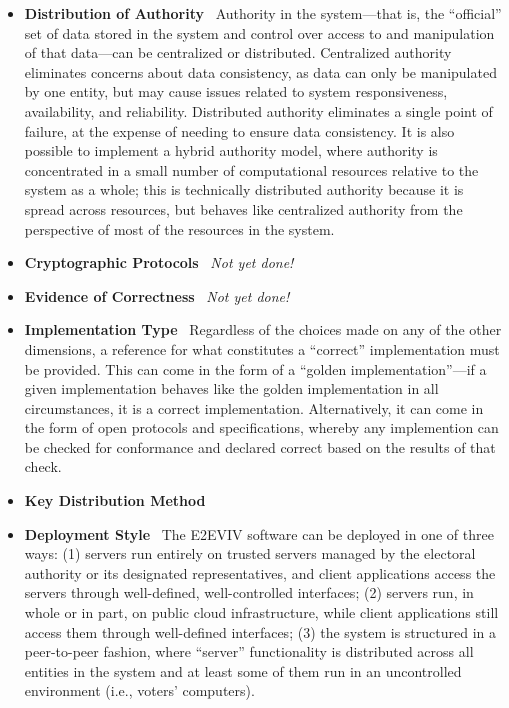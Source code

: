 \begin{itemize}
\item \textbf{Distribution of Authority} \ Authority in the
  system---that is, the ``official'' set of data stored in the system
  and control over access to and manipulation of that data---can be
  centralized or distributed. Centralized authority eliminates
  concerns about data consistency, as data can only be manipulated by
  one entity, but may cause issues related to system responsiveness,
  availability, and reliability. Distributed authority eliminates a
  single point of failure, at the expense of needing to ensure data
  consistency. It is also possible to implement a hybrid authority
  model, where authority is concentrated in a small number of
  computational resources relative to the system as a whole; this is
  technically distributed authority because it is spread across
  resources, but behaves like centralized authority from the
  perspective of most of the resources in the system.

\item \textbf{Cryptographic Protocols} \ \emph{Not yet done!}
\item \textbf{Evidence of Correctness} \ \emph{Not yet done!}
\item \textbf{Implementation Type} \ Regardless of the choices made on
  any of the other dimensions, a reference for what constitutes a
  ``correct'' implementation must be provided. This can come in the
  form of a ``golden implementation''---if a given implementation
  behaves like the golden implementation in all circumstances, it is a
  correct implementation. Alternatively, it can come in the form of
  open protocols and specifications, whereby any implemention can be
  checked for conformance and declared correct based on the results of
  that check. 

\item \textbf{Key Distribution Method} \ \lipsum[1]

\item \textbf{Deployment Style} \ The E2EVIV software can be deployed
  in one of three ways: (1) servers run entirely on trusted servers
  managed by the electoral authority or its designated
  representatives, and client applications access the servers through
  well-defined, well-controlled interfaces; (2) servers run, in whole
  or in part, on public cloud infrastructure, while client applications
  still access them through well-defined interfaces; (3) the system is
  structured in a peer-to-peer fashion, where ``server'' functionality
  is distributed across all entities in the system and at least some
  of them run in an uncontrolled environment (i.e., voters'
  computers). 


\end{itemize}
